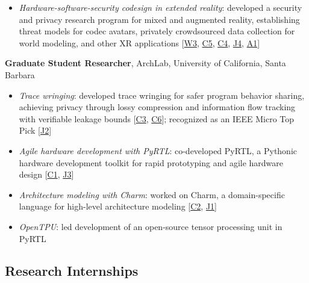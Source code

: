 \documentclass[11pt,letterpaper]{article}
\newcommand{\pref}[1]{\hyperlink{pub:#1}{[#1]}}
\newcommand{\pr}[1]{\hyperlink{pub:#1}{#1}}
\begin{document}
\begin{yearlist}
\begin{itemize}
  \item \emph{Hardware-software-security codesign in extended reality}: developed a security and privacy research program for mixed and augmented reality, establishing threat models for codec avatars, privately crowdsourced data collection for world modeling, and other XR applications [\pr{W3}, \pr{C5}, \pr{C4}, \pr{J4}, \pr{A1}]
  \end{itemize}
\item[2015--21] \textbf{Graduate Student Researcher}, ArchLab, University of California, Santa Barbara
  \begin{itemize}
  \item \emph{Trace wringing}: developed trace wringing for safer program behavior sharing, achieving privacy through lossy compression and information flow tracking with verifiable leakage bounds [\pr{C3}, \pr{C6}]; recognized as an IEEE Micro Top Pick \pref{J2}
  \item \emph{Agile hardware development with PyRTL}: co-developed PyRTL, a Pythonic hardware development toolkit for rapid prototyping and agile hardware design [\pr{C1}, \pr{J3}]
  \item \emph{Architecture modeling with Charm}: worked on Charm, a domain-specific language for high-level architecture modeling [\pr{C2}, \pr{J1}]
  \item \emph{OpenTPU}: led development of an open-source tensor processing unit in PyRTL
  \end{itemize}
\end{yearlist}

\subsection{Research Internships}
\end{document}
